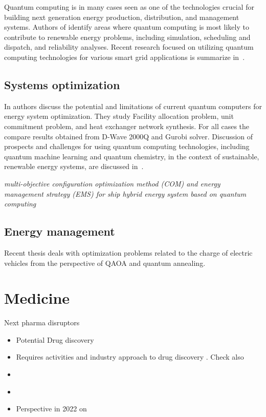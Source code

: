 \documentclass[a4paper,11pt]{article}
\begin{document}
Quantum computing is in many cases seen as one of the technologies crucial for building next generation energy production, distribution, and management systems. Authors of \cite{giani2021quantum} identify areas where quantum computing is most likely to contribute to renewable energy problems, including simulation, scheduling and dispatch, and reliability analyses. Recent research focused on utilizing quantum computing technologies for various smart grid applications is summarize in~\cite{ullah2022quantum}.


\subsection{Systems optimization}

In \cite{ajagekar2019quantum} authors discuss the potential and limitations of current quantum computers for energy system optimization. They study 
Facility allocation problem, unit commitment problem, and heat exchanger network synthesis. For all cases the compare results obtained from D-Wave 2000Q and Gurobi solver.
Discussion of prospects and challenges for using quantum computing technologies, including quantum machine learning and quantum chemistry, in the context of sustainable, renewable energy systems, are discussed in~\cite{ajagekar2022quantum}.

\emph{multi-objective configuration optimization method (COM) and energy management strategy (EMS) for ship hybrid energy system based on quantum computing} \cite{si2022configuration}


\subsection{Energy management}

Recent thesis \cite{veshchezerova2022quantum} deals with optimization problems related to the charge of electric vehicles from the perspective of QAOA and quantum annealing.



\section{Medicine}
%

Next pharma disruptors \cite{cova2021artificial}

\begin{itemize}
\item Potential Drug discovery \cite{cao2018potential}
\item Requires activities and industry approach to drug discovery \cite{zinner2022institutionalization}. Check also \cite{zinner2021quantum}
\item  \cite{floether2023state}
%
\item \cite{cordier2022biology}

\item Perspective in 2022 on \cite{blunt2022perspective}
\end{itemize}
\newpage 
\end{document}
